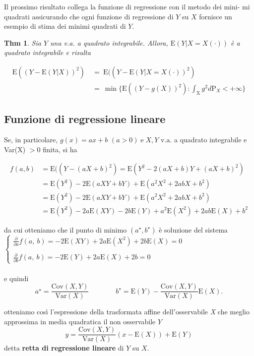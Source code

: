 \documentclass[a4paper,11pt]{article}
\theoremstyle{plain}
\newtheorem{thm}{Thm}[section]
\theoremstyle{definition}
\theoremstyle{remark}
\begin{document}
\noindent
Il prossimo risultato collega la funzione di regressione con il metodo dei mini- mi quadrati assicurando che ogni funzione di regressione di $Y$ su $X$ fornisce un esempio di stima dei minimi quadrati di $Y.$

\begin{thm} Sia $Y$ una v.a. a quadrato integrabile. Allora, $\mathrm{E}(Y|X=X(\cdot))$ \`{e} a quadrato integrabile e risulta

\begin{align*}
\mathrm{E}((Y-\mathrm{E}(Y|X))^{2})\ &=\ \mathrm{E}((Y-\mathrm{E}(Y|X=X(\cdot))^{2})\\
&=\ \min\{\mathrm{E}((Y-g(X))^{2}):\int_{\mathrm{X}}g^{2}d\mathrm{P}_{X}<+\infty\}
\end{align*}
\end{thm}

\subsection{Funzione di regressione lineare}
Se, in particolare, $g(x)=ax+b$ $(a>0)\mathrm{\; e \;}X, Y$  $\mathrm{v}.\mathrm{a}$. a quadrato integrabile e Var(X) $>0$ finita, si ha

\begin{align*}
f(a, b) &= \mathrm{E}((Y-(aX+b)^{2})=\mathrm{E}(Y^{2}-2(aX+b)Y+(aX+b)^{2})\\
&= \mathrm{E}(Y^{2})-2\mathrm{E}(aXY+bY)+\mathrm{E}(a^{2}X^{2}+2abX+b^{2})\\
&= \mathrm{E}(Y^{2})-2\mathrm{E}(aXY+bY)+\mathrm{E}(a^{2}X^{2}+2abX+b^{2})\\
&=\mathrm{E}(Y^{2})-2a\mathrm{E}(XY)-2b\mathrm{E}(Y)+a^{2}\mathrm{E}(X^{2})+2ab\mathrm{E}(X)+b^{2}
\end{align*}

\noindent
da cui otteniamo che il punto di minimo $(a^{\star}, b^{\star})$ \`{e} soluzione del sistema\\

$ \left\{\begin{array}{l} \displaystyle 
\frac{\partial}{\partial a}f(a,\ b)=-2\mathrm{E}(XY)+2a\mathrm{E}(X^{2})+2b\mathrm{E}(X)=0\\
\\
\displaystyle  \frac{\partial}{\partial b}f(a,\ b)=-2\mathrm{E}(Y)+2a\mathrm{E}(X)+2b=0
\end{array}\right.$\\
\\
\noindent
e quindi
 $$ \displaystyle a^{\star}=\frac{\mathrm{C}\mathrm{o}\mathrm{v}(X,Y)}{\mathrm{V}\mathrm{a}\mathrm{r}(X)}\ \;\;\;\;\;\;\;\;\;\;\; \;\; \displaystyle b^{\star}=\mathrm{E}(Y)-\frac{\mathrm{C}\mathrm{o}\mathrm{v}(X,Y)}{\mathrm{V}\mathrm{a}\mathrm{r}(X)}\mathrm{E}(X).$$

\noindent
otteniamo cos\`{i} l'espressione della trasformata affine $\mathrm{d}\mathrm{e}\mathrm{l}\mathrm{l}'$osservabile {\it X} che meglio approssima in media quadratica il non osservabile $Y$
$$
y=\frac{\mathrm{C}\mathrm{o}\mathrm{v}(X,Y)}{\mathrm{V}\mathrm{a}\mathrm{r}(X)}(x-\mathrm{E}(X))+\mathrm{E}(Y)
$$
\noindent
detta \textbf{retta di regressione lineare} di $Y$ su $X.$
\end{document}
